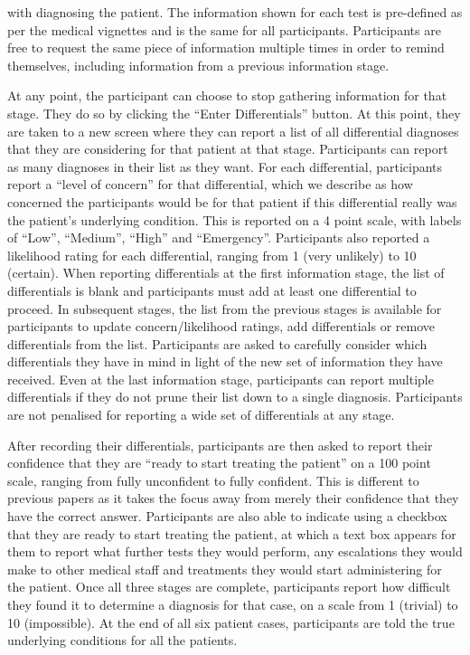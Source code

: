 \documentclass[a4paper, nobind]{templates/ociamthesis}
\begin{document}
with diagnosing the patient. The information shown for each test is pre-defined as per the medical vignettes and is the same for all participants. Participants are free to request the same piece of information multiple times in order to remind themselves, including information from a previous information stage.

At any point, the participant can choose to stop gathering information for that stage. They do so by clicking the ``Enter Differentials'' button. At this point, they are taken to a new screen where they can report a list of all differential diagnoses that they are considering for that patient at that stage. Participants can report as many diagnoses in their list as they want. For each differential, participants report a ``level of concern'' for that differential, which we describe as how concerned the participants would be for that patient if this differential really was the patient's underlying condition. This is reported on a 4 point scale, with labels of ``Low'', ``Medium'', ``High'' and ``Emergency''. Participants also reported a likelihood rating for each differential, ranging from 1 (very unlikely) to 10 (certain). When reporting differentials at the first information stage, the list of differentials is blank and participants must add at least one differential to proceed. In subsequent stages, the list from the previous stages is available for participants to update concern/likelihood ratings, add differentials or remove differentials from the list. Participants are asked to carefully consider which differentials they have in mind in light of the new set of information they have received. Even at the last information stage, participants can report multiple differentials if they do not prune their list down to a single diagnosis. Participants are not penalised for reporting a wide set of differentials at any stage.

After recording their differentials, participants are then asked to report their confidence that they are ``ready to start treating the patient'' on a 100 point scale, ranging from fully unconfident to fully confident. This is different to previous papers as it takes the focus away from merely their confidence that they have the correct answer. Participants are also able to indicate using a checkbox that they are ready to start treating the patient, at which a text box appears for them to report what further tests they would perform, any escalations they would make to other medical staff and treatments they would start administering for the patient. Once all three stages are complete, participants report how difficult they found it to determine a diagnosis for that case, on a scale from 1 (trivial) to 10 (impossible). At the end of all six patient cases, participants are told the true underlying conditions for all the patients.
\end{document}
